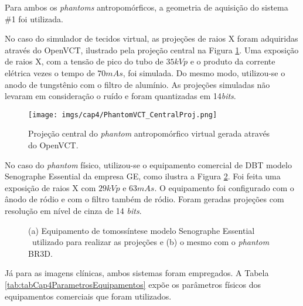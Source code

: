 Para ambos os \textit{phantoms} antropomórficos, a geometria de aquisição do sistema \#1 foi utilizada. 

No caso do simulador de tecidos virtual, as projeções de raios X foram adquiridas através do OpenVCT, ilustrado pela projeção central na Figura \ref{fig:imgCap4PhantomVCT_CentralProj}. Uma exposição de raios X, com a tensão de pico do tubo de $35kVp$ e o produto da corrente elétrica vezes o tempo de $70mAs$, foi simulada. Do mesmo modo, utilizou-se o anodo de tungstênio com o filtro de alumínio. As projeções simuladas não levaram em consideração o ruído e foram quantizadas em 14\textit{bits}.

\begin{figure}[htb]
	\caption{Projeção central do \textit{phantom} antropomórfico virtual gerada através do OpenVCT.}
	\begin{center}
		\texttt{[image: imgs/cap4/PhantomVCT\_CentralProj.png]}
	\end{center}
	\label{fig:imgCap4PhantomVCT_CentralProj}
\end{figure} 

No caso do \textit{phantom} físico, utilizou-se  o equipamento comercial de \acs{DBT} modelo Senographe Essential{\footnotesize \texttrademark} \space da empresa \acs{GE}, como ilustra a Figura \ref{fig:imgCap4EquipamentoGE}. Foi feita uma exposição de raios X com $29kVp$ e $63mAs$. O equipamento foi configurado com o ânodo de ródio e com o filtro também de ródio. Foram geradas projeções com resolução em nível de cinza de 14 \textit{bits}.

\begin{figure}[htb]
	\centering
	
	\caption{(a) Equipamento de tomossíntese modelo Senographe Essential{\footnotesize \texttrademark} \ utilizado para realizar as projeções e (b) o mesmo com o \textit{phantom} BR3D.}
	
	\hfil
	
	\label{fig:imgCap4EquipamentoGE}
\end{figure} 

Já para as imagens clínicas, ambos sistemas foram empregados. A Tabela \ref{tab:tabCap4ParametrosEquipamentos} expõe os parâmetros físicos dos equipamentos comerciais que foram utilizados.

